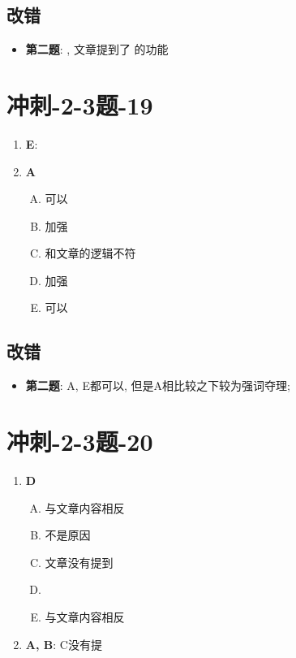   \subsection{改错}

    \begin{itemize}
      \item \textbf{第二题}: , 文章提到了
      的功能
    \end{itemize}

\section{冲刺-2-3题-19}

  \begin{enumerate}
    \item \textbf{E}: 
    \item \textbf{A}
    \begin{enumerate}[A.]
      \item 可以
      \item 加强
      \item 和文章的逻辑不符
      \item 加强
      \item 可以
    \end{enumerate}
  \end{enumerate}

  \subsection{改错}

    \begin{itemize}
      \item \textbf{第二题}: A, E都可以, 但是A相比较之下较为强词夺理;
    \end{itemize}

\section{冲刺-2-3题-20}

  \begin{enumerate}
    \item \textbf{D}
    \begin{enumerate}[A.]
      \item 与文章内容相反
      \item {}不是原因
      \item 文章没有提到
      \item %
      \item 与文章内容相反
    \end{enumerate}

    \item \textbf{A, B}: C没有提
  \end{enumerate}

